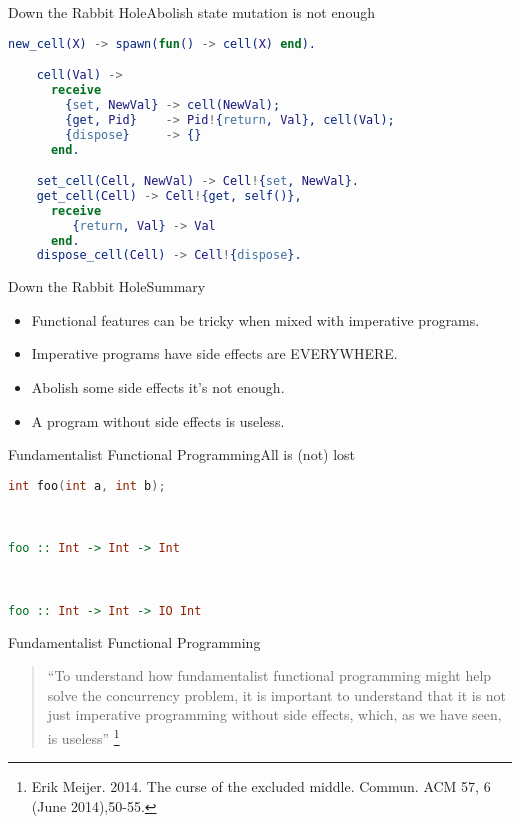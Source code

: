 \documentclass[rail]{beamer}
\begin{document}
\begin{frame}[fragile]{Down the Rabbit Hole}{Abolish state mutation is not enough}
  \begin{lstlisting}[language=erlang]
    new_cell(X) -> spawn(fun() -> cell(X) end).

    cell(Val) ->
      receive
        {set, NewVal} -> cell(NewVal);
        {get, Pid}    -> Pid!{return, Val}, cell(Val);
        {dispose}     -> {}
      end.

    set_cell(Cell, NewVal) -> Cell!{set, NewVal}.
    get_cell(Cell) -> Cell!{get, self()},
      receive
         {return, Val} -> Val
      end.
    dispose_cell(Cell) -> Cell!{dispose}.

  \end{lstlisting}
\end{frame}

\begin{frame}{Down the Rabbit Hole}{Summary}
  \begin{itemize}[<+->]
  \item Functional features can be tricky when mixed with imperative programs.
  \item Imperative programs have side effects are EVERYWHERE.
  \item Abolish some side effects it's not enough.
  \item A program without side effects is useless.
  \end{itemize}
\end{frame}

\begin{frame}[fragile]{Fundamentalist Functional Programming}{All is (not) lost}
  \begin{lstlisting}[language=C]
    int foo(int a, int b);
  \end{lstlisting}
  \pause
  \hfill\\
  \begin{lstlisting}[language=Haskell]
    foo :: Int -> Int -> Int
  \end{lstlisting}
  \pause
  \hfill\\
  \begin{lstlisting}[language=Haskell]
    foo :: Int -> Int -> IO Int
  \end{lstlisting}
\end{frame}

\begin{frame}{Fundamentalist Functional Programming}
  \begin{quote}
    ``To understand how fundamentalist functional programming might
    help solve the concurrency problem, it is important to understand
    that it is not just imperative programming without side effects,
    which, as we have seen, is useless''
    \footnote[frame,1] {Erik Meijer. 2014. The curse of the
      excluded middle. Commun. ACM 57, 6 (June 2014),50-55.}
  \end{quote}
\end{frame}
\end{document}
